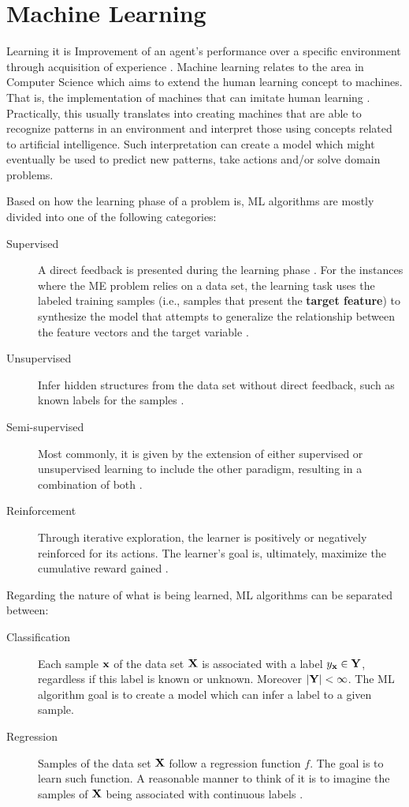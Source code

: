 \clearpage
\section{Machine Learning}
Learning it is Improvement of an agent's performance over a specific environment through acquisition of experience \cite{pat1996}. Machine learning relates to the area in Computer Science which aims to extend the human learning concept to machines. That is, the implementation of machines that can imitate human learning \cite{hot2009}. Practically, this usually translates into creating machines that are able to recognize patterns in an environment and interpret those using concepts related to artificial intelligence. Such interpretation can create a model which might eventually be used to predict new patterns, take actions and/or solve domain problems.

Based on how the learning phase of a problem is, ML algorithms are mostly divided into one of the following categories:

\begin{description}
	\item[Supervised] A direct feedback is presented during the learning phase \cite{pat1996}. For the instances where the ME problem relies on a data set, the learning task uses the labeled training samples (i.e., samples that present the \textbf{target feature}) to synthesize the model that attempts to generalize the relationship between the feature vectors and the target variable \cite{awa2015}.
	
	\item[Unsupervised] Infer hidden structures from the data set without direct feedback, such as known labels for the samples \cite{awa2015}.
	
	\item[Semi-supervised] Most commonly, it is given by the extension of either supervised or unsupervised learning to include the other paradigm, resulting in a combination of both \cite{zhu2009}.
	
	\item[Reinforcement] Through iterative exploration, the learner is positively or negatively reinforced for its actions. The learner's goal is, ultimately, maximize the cumulative reward gained \cite{awa2015}.
\end{description}

Regarding the nature of what is being learned, ML algorithms can be separated between:
\begin{description}
	\item[Classification] Each sample $\mathbf{x}$ of the data set $\mathbf{X}$ is associated with a label $y_{\mathbf{x}} \in \mathbf{Y}$, regardless if this label is known or unknown. Moreover $|\mathbf{Y}| < \infty$. The ML algorithm goal is to create a model which can infer a label to a given sample.
	\item[Regression] Samples of the data set $\mathbf{X}$ follow a regression function $f$. The goal is to learn such function. A reasonable manner to think of it is to imagine the samples of $\mathbf{X}$ being associated with continuous labels \cite{kramer2013dimensionality}.
\end{description}

